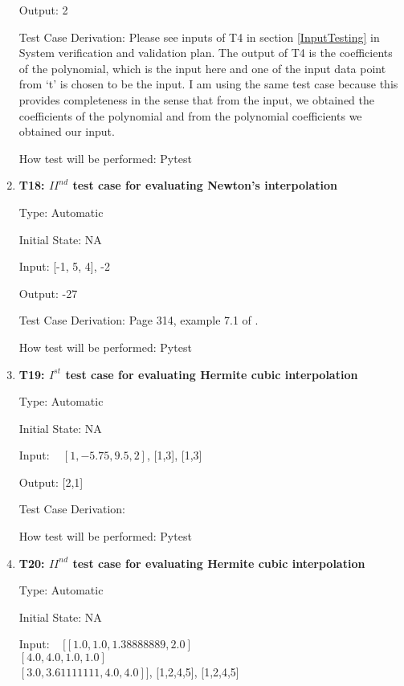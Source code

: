 \documentclass[12pt, titlepage]{article}
\begin{document}
\begin{enumerate}
Output: 2

Test Case Derivation: Please see inputs of T4 in section \ref{InputTesting} in 
System verification and validation plan. The output of T4 is the coefficients 
of the polynomial, which is the input here and one of the input data point from 
`t' is chosen to be the input. I am using the same test case because this 
provides completeness in the sense that from the input, we obtained the 
coefficients of the polynomial and from the polynomial coefficients we obtained 
our input. 

How test will be performed: Pytest

\item{\textbf{T18: ${II}^{nd}$ test case for evaluating Newton's interpolation}}

Type: Automatic

Initial State: NA 

Input: [-1, 5, 4], -2 

Output: -27

Test Case Derivation: Page 314, example 7.1 of \cite{Health1997}. 

How test will be performed: Pytest



\item{\textbf{T19: $I^{st}$ test case for evaluating Hermite cubic 
interpolation}}

Type: Automatic

Initial State: NA 

Input: ~\newline 
$[1,-5.75, 9.5, 2]$, [1,3], [1,3]						

Output: [2,1]

Test Case Derivation: \cite{HermiteCubic2}

How test will be performed: Pytest

\item{\textbf{T20: ${II}^{nd}$ test case for evaluating Hermite cubic 
interpolation}}

Type: Automatic

Initial State: NA 

Input: ~\newline 
$[[1.0,1.0, 1.38888889, 2.0]$\\
$[4.0, 4.0, 1.0, 1.0]$\\
$[3.0, 3.61111111, 4.0, 4.0]]$, [1,2,4,5], [1,2,4,5]					


\end{enumerate}
\end{document}

